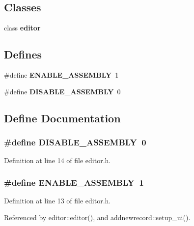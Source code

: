 \subsection*{Classes}
\begin{CompactItemize}
\item 
class {\bf editor}
\end{CompactItemize}
\subsection*{Defines}
\begin{CompactItemize}
\item 
\#define {\bf ENABLE\_\-ASSEMBLY}~1
\item 
\#define {\bf DISABLE\_\-ASSEMBLY}~0
\end{CompactItemize}


\subsection{Define Documentation}
\subsubsection{\setlength{\rightskip}{0pt plus 5cm}\#define DISABLE\_\-ASSEMBLY~0}\label{editor_8h_2589201cc53299df220b0f9a3216e01b}




Definition at line 14 of file editor.h.
\subsubsection{\setlength{\rightskip}{0pt plus 5cm}\#define ENABLE\_\-ASSEMBLY~1}\label{editor_8h_912f15c2c0cce9013e52b914f94c1128}




Definition at line 13 of file editor.h.

Referenced by editor::editor(), and addnewrecord::setup\_\-ui().